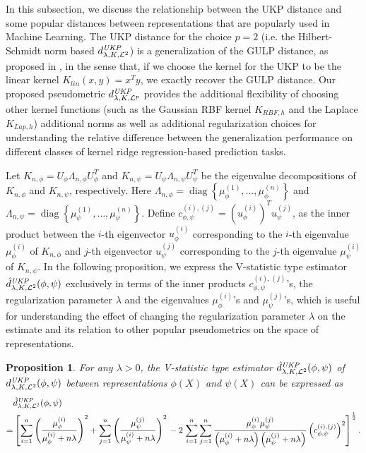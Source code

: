\documentclass{article} %
\newcommand{\repone}{\phi}
\newcommand{\reptwo}{\psi}
\newcommand{\metricstname}{UKP }
\newcommand{\dtwo}{d_{\lambda,K,\mathcal{L}^{2}}^{\emph{\metricstname}}}
\newcommand{\dtwohat}{\hat{d}_{\lambda,K,\mathcal{L}^{2}}^{\emph{\metricstname}}}
\newcommand{\dLp}{d_{\lambda,K,\mathcal{L}^{p}}^{\emph{\metricstname}}}
\theoremstyle{plain}
\newcounter{propositionno}
\newtheorem{proposition}[propositionno]{Proposition}
\begin{document}
In this subsection, we discuss the relationship between the \metricstname distance and some popular distances between representations that are popularly used in Machine Learning.
The \metricstname distance for the choice $p=2$ (i.e. the Hilbert-Schmidt norm based $\dtwo$) is a generalization of the GULP distance, as proposed in \citet{GULP}, in the sense that, if we choose the kernel for the \metricstname to be the linear kernel $K_{lin}(x,y) = x^{T}y$, we exactly recover the GULP distance. Our proposed pseudometric $\dLp$ provides the additional flexibility of choosing other kernel functions (such as the Gaussian RBF kernel $K_{RBF,h}$ and the Laplace $K_{Lap,h}$) additional norms as well as additional regularization choices for understanding the relative difference between the generalization performance on different classes of kernel ridge regression-based prediction tasks. 

Let $K_{n,\repone} = U_{\repone} \Lambda_{n,\repone}U_{\repone}^{T}$ and $K_{n,\reptwo} = U_{\reptwo} \Lambda_{n,\reptwo}U_{\reptwo}^{T}$ be the eigenvalue decompositions of $K_{n,\repone}$ and 
$K_{n,\reptwo}$, respectively. Here $\Lambda_{n,\repone} = \operatorname{diag}\left\{\mu_{\repone}^{(1)},\dots,\mu_{\repone}^{(n)}\right\}$ and $\Lambda_{n,\reptwo} = \operatorname{diag}\left\{\mu_{\reptwo}^{(1)},\dots,\mu_{\reptwo}^{(n)}\right\}$. Define $c_{\repone,\reptwo}^{(i),(j)} = \left(u_{\repone}^{(i)}\right)^{T}u_{\reptwo}^{(j)}$, as the inner product between the $i$-th eigenvector $u_{\repone}^{(i)}$ corresponding to the $i$-th eigenvalue $\mu_{\repone}^{(i)}$ of $K_{n,\repone}$ and $j$-th eigenvector $u_{\reptwo}^{(j)}$ corresponding to the $j$-th eigenvalue $\mu_{\reptwo}^{(i)}$  of $K_{n,\reptwo}$. In the following proposition, we express the V-statistic type estimator $\dtwohat(\repone,\reptwo)$ exclusively in terms of the inner products $c_{\repone,\reptwo}^{(i),(j)}$'s, the regularization parameter $\lambda$ and the eigenvalues $\mu_{\repone}^{(i)}$'s and $\mu_{\reptwo}^{(j)}$'s, which is useful for understanding the effect of changing the regularization parameter $\lambda$ on the estimate and its relation to other popular pseudometrics on the space of representations.

\begin{proposition}\label{Proposition: Estimator in terms of eigenvalues and eigenvectors of Gram matrices}
    For any $\lambda>0$, the V-statistic type estimator $\dtwohat(\repone,\reptwo)$ of $\dtwo(\repone,\reptwo)$ between representations $\repone(X)$ and $\reptwo(X)$ can be expressed as
    \[
    \begin{aligned}
        &\dtwohat(\repone,\reptwo)\\
        =& \left[\sum_{i=1}^{n} \left(\frac{\mu_{\repone}^{(i)}}{\mu_{\repone}^{(i)}+ n\lambda}\right)^{2} + \sum_{j=1}^{n} \left(\frac{\mu_{\reptwo}^{(j)}}{\mu_{\reptwo}^{(i)}+ n\lambda}\right)^{2}\right.-2\left.\sum_{i=1}^{n}\sum_{j=1}^{n}\frac{\mu_{\repone}^{(i)}\mu_{\reptwo}^{(j)}}{\left(\mu_{\repone}^{(i)} + n\lambda\right)\left(\mu_{\reptwo}^{(j)} + n\lambda\right)}\left(c_{\repone,\reptwo}^{(i),(j)} \right)^{2}\right]^{\frac{1}{2}}.
    \end{aligned}
    \]
\end{proposition}
\end{document}
